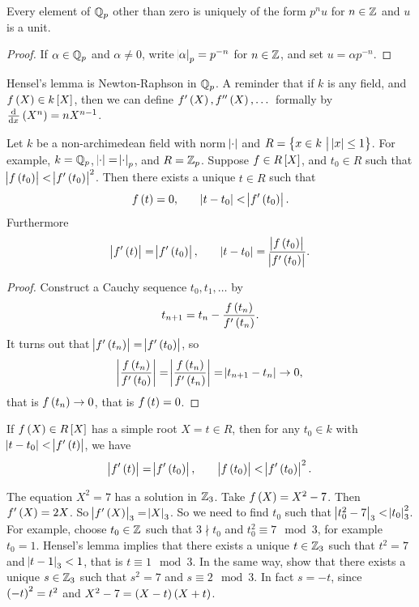 \begin{corollary}
Every element of $ \mathbb{Q}_p $ other than zero is uniquely of the form $ p^nu $ for $ n \in \mathbb{Z} $ and $ u $ is a unit.
\end{corollary}

\begin{proof}
If $ \alpha \in \mathbb{Q}_p $ and $ \alpha \ne 0 $, write $ \abs{\alpha}_p = p^{-n} $ for $ n \in \mathbb{Z} $, and set $ u = \alpha p^{-n} $.
\end{proof}

Hensel's lemma is Newton-Raphson in $ \mathbb{Q}_p $. A reminder that if $ k $ is any field, and $ f\br{X} \in k\sbr{X} $, then we can define $ f'\br{X}, f''\br{X}, \dots $ formally by $ \tod{}{x}\br{X^n} = nX^{n - 1} $.

\begin{theorem}
Let $ k $ be a non-archimedean field with norm $ \abs{\cdot} $ and $ R = \cbr{x \in k \st \abs{x} \le 1} $. For example, $ k = \mathbb{Q}_p $, $ \abs{\cdot} = \abs{\cdot}_p $, and $ R = \mathbb{Z}_p $. Suppose $ f \in R\sbr{X} $, and $ t_0 \in R $ such that $ \abs{f\br{t_0}} < \abs{f'\br{t_0}}^2 $. Then there exists a unique $ t \in R $ such that
$$ f\br{t} = 0, \qquad \abs{t - t_0} < \abs{f'\br{t_0}}. $$
Furthermore
$$ \abs{f'\br{t}} = \abs{f'\br{t_0}}, \qquad \abs{t - t_0} = \dfrac{\abs{f\br{t_0}}}{\abs{f'\br{t_0}}}. $$
\end{theorem}

\begin{proof}
Construct a Cauchy sequence $ t_0, t_1, \dots $ by
$$ t_{n + 1} = t_n - \dfrac{f\br{t_n}}{f'\br{t_n}}. $$
It turns out that $ \abs{f'\br{t_n}} = \abs{f'\br{t_0}} $, so
$$ \abs{\dfrac{f\br{t_n}}{f'\br{t_0}}} = \abs{\dfrac{f\br{t_n}}{f'\br{t_n}}} = \abs{t_{n + 1} - t_n} \to 0, $$
that is $ f\br{t_n} \to 0 $, that is $ f\br{t} = 0 $.
\end{proof}

\begin{lemma}
If $ f\br{X} \in R\sbr{X} $ has a simple root $ X = t \in R $, then for any $ t_0 \in k $ with $ \abs{t - t_0} < \abs{f'\br{t}} $, we have
$$ \abs{f'\br{t}} = \abs{f'\br{t_0}}, \qquad \abs{f\br{t_0}} < \abs{f'\br{t_0}}^2. $$
\end{lemma}

\begin{exercise}
The equation $ X^2 = 7 $ has a solution in $ \mathbb{Z}_3 $. Take $ f\br{X} = X^2 - 7 $. Then $ f'\br{X} = 2X $. So $ \abs{f'\br{X}}_3 = \abs{X}_3 $. So we need to find $ t_0 $ such that $ \abs{t_0^2 - 7}_3 < \abs{t_0}_3^2 $. For example, choose $ t_0 \in \mathbb{Z} $ such that $ 3 \nmid t_0 $ and $ t_0^2 \equiv 7 \mod 3 $, for example $ t_0 = 1 $. Hensel's lemma implies that there exists a unique $ t \in \mathbb{Z}_3 $ such that $ t^2 = 7 $ and $ \abs{t - 1}_3 < 1 $, that is $ t \equiv 1 \mod 3 $. In the same way, show that there exists a unique $ s \in \mathbb{Z}_3 $ such that $ s^2 = 7 $ and $ s \equiv 2 \mod 3 $. In fact $ s = -t $, since $ \br{-t}^2 = t^2 $ and $ X^2 - 7 = \br{X - t}\br{X + t} $.
\end{exercise}

